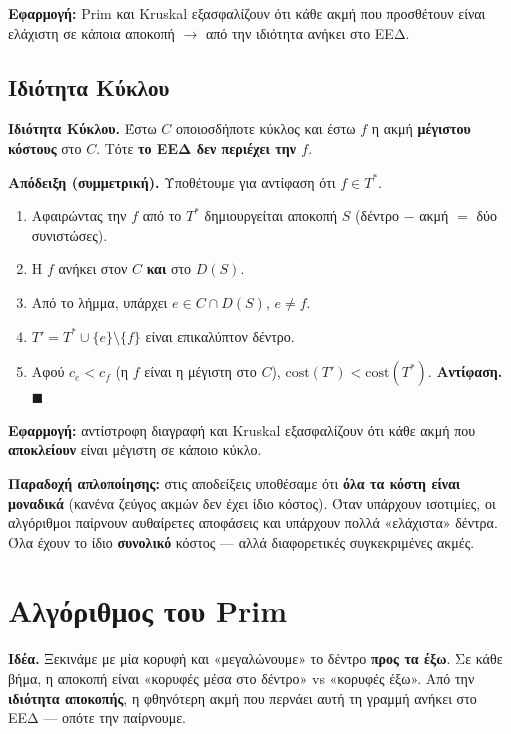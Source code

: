 \documentclass[11pt,a4paper]{article}
\begin{document}
\textbf{Εφαρμογή:} Prim και Kruskal εξασφαλίζουν ότι κάθε ακμή που προσθέτουν
είναι ελάχιστη σε κάποια αποκοπή $\to$ από την ιδιότητα ανήκει στο ΕΕΔ.

\subsection{Ιδιότητα Κύκλου}

\begin{keypoint}
\textbf{Ιδιότητα Κύκλου.} Έστω $C$ οποιοσδήποτε κύκλος και έστω $f$ η ακμή
\textbf{μέγιστου κόστους} στο $C$. Τότε \textbf{το ΕΕΔ δεν περιέχει την $f$}.
\end{keypoint}

\textbf{Απόδειξη (συμμετρική).} Υποθέτουμε για αντίφαση ότι $f \in T^*$.
\begin{enumerate}
  \item Αφαιρώντας την $f$ από το $T^*$ δημιουργείται αποκοπή $S$ (δέντρο
  $-$ ακμή $=$ δύο συνιστώσες).
  \item Η $f$ ανήκει στον $C$ \textbf{και} στο $D(S)$.
  \item Από το λήμμα, υπάρχει $e \in C \cap D(S)$, $e \ne f$.
  \item $T' = T^* \cup \{e\} \setminus \{f\}$ είναι επικαλύπτον δέντρο.
  \item Αφού $c_e < c_f$ (η $f$ είναι η μέγιστη στο $C$),
  $\text{cost}(T') < \text{cost}(T^*)$. \textbf{Αντίφαση.} $\blacksquare$
\end{enumerate}

\textbf{Εφαρμογή:} αντίστροφη διαγραφή και Kruskal εξασφαλίζουν ότι κάθε ακμή που
\textbf{αποκλείουν} είναι μέγιστη σε κάποιο κύκλο.

\begin{intuition}
\textbf{Παραδοχή απλοποίησης:} στις αποδείξεις υποθέσαμε ότι \textbf{όλα τα κόστη
είναι μοναδικά} (κανένα ζεύγος ακμών δεν έχει ίδιο κόστος). Όταν υπάρχουν
ισοτιμίες, οι αλγόριθμοι παίρνουν αυθαίρετες αποφάσεις και υπάρχουν πολλά
«ελάχιστα» δέντρα. Όλα έχουν το ίδιο \textbf{συνολικό} κόστος --- αλλά
διαφορετικές συγκεκριμένες ακμές.
\end{intuition}

\section{Αλγόριθμος του Prim}

\textbf{Ιδέα.} Ξεκινάμε με μία κορυφή και «μεγαλώνουμε» το δέντρο \textbf{προς τα
έξω}. Σε κάθε βήμα, η αποκοπή είναι «κορυφές μέσα στο δέντρο» vs «κορυφές έξω».
Από την \textbf{ιδιότητα αποκοπής}, η φθηνότερη ακμή που περνάει αυτή τη γραμμή
ανήκει στο ΕΕΔ --- οπότε την παίρνουμε.
\end{document}
